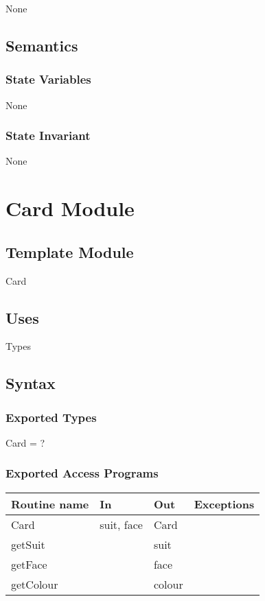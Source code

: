 \documentclass[12pt]{article}
\begin{document}
None

\subsection* {Semantics}

\subsubsection* {State Variables}

None

\subsubsection* {State Invariant}

None

\newpage

\section* {Card Module}

\subsection*{Template Module}

Card

\subsection* {Uses}

Types

\subsection* {Syntax}

\subsubsection* {Exported Types}

Card = ? 

\subsubsection* {Exported Access Programs}

\begin{tabular}{| l | l | l | l |}
	\hline
	\textbf{Routine name} & \textbf{In} & \textbf{Out} & \textbf{Exceptions}\\
	\hline
	Card & suit, face & Card & \\
	\hline
	getSuit & ~ & suit & ~\\
	\hline
	getFace & ~ & face & ~\\
	\hline
	getColour & ~ & colour & ~\\
	\hline
\end{tabular}
\end{document}
